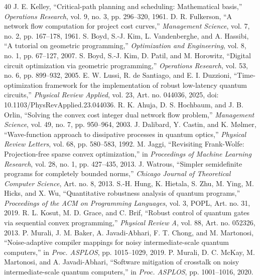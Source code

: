 \documentclass[10pt,letterpaper,journal]{IEEEtran}
\begin{document}
\begin{thebibliography}{40}
 J. E. Kelley, ``Critical-path planning and scheduling: Mathematical basis,'' \emph{Operations Research}, vol. 9, no. 3, pp. 296--320, 1961.
 D. R. Fulkerson, ``A network flow computation for project cost curves,'' \emph{Management Science}, vol. 7, no. 2, pp. 167--178, 1961.
 S. Boyd, S.-J. Kim, L. Vandenberghe, and A. Hassibi, ``A tutorial on geometric programming,'' \emph{Optimization and Engineering}, vol. 8, no. 1, pp. 67--127, 2007.
 S. Boyd, S.-J. Kim, D. Patil, and M. Horowitz, ``Digital circuit optimization via geometric programming,'' \emph{Operations Research}, vol. 53, no. 6, pp. 899--932, 2005.
 E. W. Lussi, R. de Santiago, and E. I. Duzzioni, ``Time-optimization framework for the implementation of robust low-latency quantum circuits,'' \emph{Physical Review Applied}, vol. 23, Art. no. 044036, 2025, doi: 10.1103/PhysRevApplied.23.044036.
 R. K. Ahuja, D. S. Hochbaum, and J. B. Orlin, ``Solving the convex cost integer dual network flow problem,'' \emph{Management Science}, vol. 49, no. 7, pp. 950--964, 2003.
 J. Dalibard, Y. Castin, and K. M\o lmer, ``Wave-function approach to dissipative processes in quantum optics,'' \emph{Physical Review Letters}, vol. 68, pp. 580--583, 1992.
 M. Jaggi, ``Revisiting Frank-Wolfe: Projection-free sparse convex optimization,'' in \emph{Proceedings of Machine Learning Research}, vol. 28, no. 1, pp. 427--435, 2013.
 J. Watrous, ``Simpler semidefinite programs for completely bounded norms,'' \emph{Chicago Journal of Theoretical Computer Science}, Art. no. 8, 2013.
 S.-H. Hung, K. Hietala, S. Zhu, M. Ying, M. Hicks, and X. Wu, ``Quantitative robustness analysis of quantum programs,'' \emph{Proceedings of the ACM on Programming Languages}, vol. 3, POPL, Art. no. 31, 2019.
 R. L. Kosut, M. D. Grace, and C. Brif, ``Robust control of quantum gates via sequential convex programming,'' \emph{Physical Review A}, vol. 88, Art. no. 052326, 2013.
 P. Murali, J. M. Baker, A. Javadi-Abhari, F. T. Chong, and M. Martonosi, ``Noise-adaptive compiler mappings for noisy intermediate-scale quantum computers,'' in \emph{Proc. ASPLOS}, pp. 1015--1029, 2019.
 P. Murali, D. C. McKay, M. Martonosi, and A. Javadi-Abhari, ``Software mitigation of crosstalk on noisy intermediate-scale quantum computers,'' in \emph{Proc. ASPLOS}, pp. 1001--1016, 2020.

\end{thebibliography}
\end{document}
